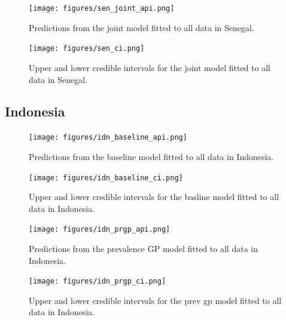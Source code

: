 \documentclass[10pt,a4]{article}
\begin{document}
\begin{figure}[h!]
\centering

\texttt{[image: figures/sen\_joint\_api.png]}

\caption{Predictions from the joint model fitted to all data in Senegal.}
\label{jointsen}
\end{figure}


\begin{figure}[h!]
\centering

\texttt{[image: figures/sen\_ci.png]}

\caption{Upper and lower credible intervals for the joint model fitted to all data in Senegal.}
\label{jointsenci}
\end{figure}



\clearpage
\subsection{Indonesia}


\begin{figure}[h!]
\centering

\texttt{[image: figures/idn\_baseline\_api.png]}

\caption{Predictions from the baseline model fitted to all data in Indonesia.}
\label{baselineidn}
\end{figure}

\begin{figure}[h!]
\centering

\texttt{[image: figures/idn\_baseline\_ci.png]}

\caption{Upper and lower credible intervals for the basline model fitted to all data in Indonesia.}
\label{basemdgci}
\end{figure}



\begin{figure}[h!]
\centering

\texttt{[image: figures/idn\_prgp\_api.png]}

\caption{Predictions from the prevalence GP model fitted to all data in Indonesia.}
\label{gpidn}
\end{figure}


\begin{figure}[h!]
\centering

\texttt{[image: figures/idn\_prgp\_ci.png]}

\caption{Upper and lower credible intervals for the prev gp model fitted to all data in Indonesia.}
\label{prgpmdgci}
\end{figure}
\end{document}
